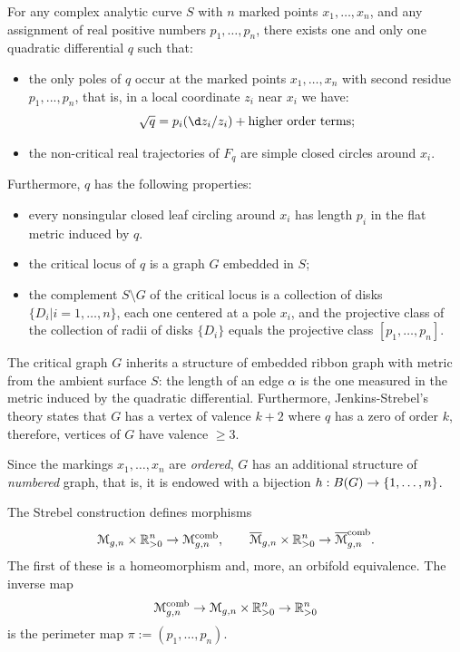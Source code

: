 \begin{theorem} 
  \label{thm:JS1}
  For any complex analytic curve $S$ with $n$ marked points $x_1, \ldots,
  x_n$, and any assignment of real positive numbers $p_1, \ldots, p_n$,
  there exists one and only one quadratic differential $q$ such that:
  \begin{itemize}
  \item the only poles of $q$ occur at the marked points $x_1, \ldots, x_n$
    with second residue $p_1, ..., p_n$, that is, in a local
    coordinate $z_i$ near $x_i$ we have:
    \begin{equation*}
      \sqrt{q} = p_i (\d z_i / z_i) + \text{higher order terms};
    \end{equation*}
  \item the non-critical real trajectories of $F_q$ are simple closed
    circles around $x_i$.
  \end{itemize}
  Furthermore, $q$ has the following properties:
  \begin{itemize}
  \item every nonsingular closed leaf circling around $x_i$ has length
    $p_i$ in the flat metric induced by $q$.
  \item the critical locus of $q$ is a graph $G$ embedded in $S$;
  \item the complement $S \setminus G$ of the critical locus is a collection
    of disks $\{D_i | i=1,\ldots,n\}$, each one centered at a pole $x_i$, and
    the projective class of the collection of radii of disks $\{D_i\}$
    equals the projective class $[p_1, \ldots, p_n]$.
  \end{itemize}
\end{theorem}
The critical graph $G$ inherits a structure of embedded ribbon graph
with metric from the ambient surface $S$: the length of an edge $\alpha$ is
the one measured in the metric induced by the quadratic differential.
Furthermore, Jenkins-Strebel's theory states that $G$ has a vertex of
valence $k+2$ where $q$ has a zero of order $k$, therefore, vertices
of $G$ have valence $\geq3$. 

Since the markings $x_1, \ldots, x_n$ are \emph{ordered}, $G$ has an
additional structure of \emph{numbered} graph, that is, it is endowed
with a bijection $h: B(G) \to \{1, \ldots, n\}$.


\begin{theorem} 
  The Strebel construction defines morphisms
  \begin{equation*}
    \mathcal{M}_{g,n} \times \mathbb{R}_{>0}^n \to \mathcal{M}\sp{\text{comb}}_{g,n}, \qquad \overline{\mathcal{M}}_{g,n} \times
    \mathbb{R}_{>0}^n \to \overline{\mathcal{M}}\sp{\text{comb}}_{g,n}.
  \end{equation*}
  The first of these is a homeomorphism and, more, an orbifold
  equivalence. The inverse map
  \begin{equation*}
    \mathcal{M}\sp{\text{comb}}_{g,n} \to \mathcal{M}_{g,n} \times \mathbb{R}_{>0}^n \to \mathbb{R}_{>0}^n
  \end{equation*}
  is the perimeter map $\pi := (p_1, \ldots, p_n)$.  
\end{theorem}

